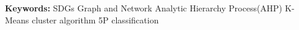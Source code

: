 \documentclass[12pt]{article}
\begin{document}
\begin{comment}

联合国制定了17项可持续发展目标，它们代表着人类对于未来世界的美好愿景。这17项目标相互之间可能有着影响，积极的或者是消极的。处理这些目标需要有一个先后顺序，那么确定最为优先的事项就显得尤为重要。因此我们需要一个有关图与网络的模型和一个能够确定最优先事项的模型。

在任务一中，我们构建了一个关于17个可持续发展目标的网络图，在这个图中我们根据17个目标的分类，给相同的目标所代表的点涂上一样的颜色，并且使用连线来表示他们相互之间的关系。为了避免出现点与线的交错，我们让这17个目标围成一圈，这样子我们的图看起来就会比较清楚。

在任务二中，我们使用传统的AHP方法来构建从17个目标中取得最优目标的模型。首先我们给定了5个评价目标的标准作为AHP的决策层，然后17个目标作为方案层。这样子通过AHP的比较判别矩阵的算法来求解出5个评价标准的评价权重以及每个目标的优先程度（通过数值来表示），这样子优先程度数值最高的就成为了优先考虑事项。

在任务三中，我们需要考虑如果某个目标被完成之后，新的最优先事项是什么。考虑到传统的AHP方法会带来比较繁琐的运算和庞大的人为赋值，同时一个目标被移除会导致原矩阵的参数需要变动，因此我们使用K-Means聚类算法来进行17个目标的分类。分好类之后我们将同类的目标放进AHP的方案层里面，不同的目标不同时放进，这样子每一类的局部最优先事项就可求出。最后再将这些局部最优先事项放进AHP中，得到最优的事项。

在任务四中，由于出现了一些突发事件，因此我们考虑到原先的决策层可能不再适用，因此我们选择将原来的决策层更换为联合国官方为17个目标做的分类5Ps，这样子就可以适应于新的情境。而其他的操作和任务三差不多。在这里我们讨论了当经济、科技、政治、环境因素发生变化的时候，作为决策层指标的5Ps会发生什么变化；同时我们将这些变化与原先状态下进行比对，绘制了饼图。

在任务五中，我们详细讨论了其他的公司和组织可以通过我们的模型解决什么样的问题，如何通过我们的模型解决问题。同时我们考虑到实际的问题中可能会出现的其他的情况，因此后面对于任务5的表述中也会提到对于这一种情况我们提出了什么样的优化建议。

最后，我们进行了灵敏度分析，同时分析了模型的优缺点，最后进行了对于该模型的未来展望。

\end{comment}



\vspace{0.4cm}
\noindent \textbf{Keywords:} SDGs \quad Graph and Network \quad Analytic Hierarchy Process(AHP) \quad K-Means cluster algorithm \quad 5P classification

\clearpage
\pagestyle{fancy}
\newpage
\setcounter{page}{1}
\tableofcontents
\newpage








\end{document}
